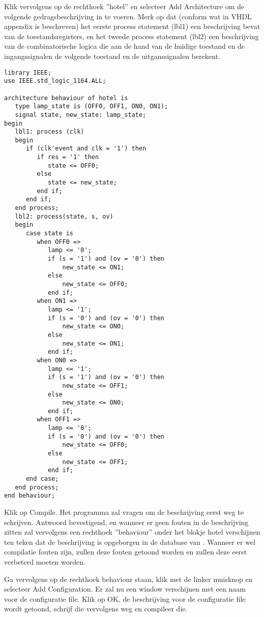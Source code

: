 Klik vervolgens op de rechthoek ''hotel'' en selecteer Add Architecture
om de volgende gedragsbeschrijving in te voeren.
Merk op dat (conform wat in VHDL appendix is beschreven)
het eerste process statement (lbl1) een beschrijving bevat van 
de toestandsregisters, en het tweede process statement
(lbl2) een beschrijving van de combinatorische logica
die aan de hand van de huidige toestand en de ingangssignalen
de volgende toestand en de uitganssignalen berekent.
\begin{verbatim}
library IEEE;
use IEEE.std_logic_1164.ALL;

architecture behaviour of hotel is
   type lamp_state is (OFF0, OFF1, ON0, ON1);
   signal state, new_state: lamp_state;
begin
   lbl1: process (clk)
   begin
      if (clk'event and clk = '1') then
         if res = '1' then
            state <= OFF0;
         else
            state <= new_state;
         end if;
      end if;
   end process;
   lbl2: process(state, s, ov)
   begin
      case state is
         when OFF0 =>
            lamp <= '0';
            if (s = '1') and (ov = '0') then
                new_state <= ON1;
            else
                new_state <= OFF0;
            end if;
         when ON1 =>
            lamp <= '1';
            if (s = '0') and (ov = '0') then
                new_state <= ON0;
            else
                new_state <= ON1;
            end if;
         when ON0 =>
            lamp <= '1';
            if (s = '1') and (ov = '0') then
                new_state <= OFF1;
            else
                new_state <= ON0;
            end if;
         when OFF1 =>
            lamp <= '0';
            if (s = '0') and (ov = '0') then
                new_state <= OFF0;
            else
                new_state <= OFF1;
            end if;
      end case;
   end process;
end behaviour;
\end{verbatim}
Klik op Compile. Het programma zal vragen om de beschrijving eerst
weg te schrijven. Antwoord bevestigend, en wanneer er geen fouten
in de beschrijving zitten zal vervolgens een rechthoek ''behaviour'' 
onder het blokje hotel verschijnen ten teken dat
de beschrijving is opgeborgen in de database van .
Wanneer er wel compilatie fouten zijn, zullen deze fouten getoond
worden en zullen deze eerst verbeterd moeten worden.

Ga vervolgens op de rechthoek behaviour staan, klik met de linker muisknop
en selecteer Add Configuration.
Er zal nu een window verschijnen met een naam voor de  configuratie
file.  
Klik op OK, de  beschrijving voor de configuratie file wordt getoond,
schrijf die vervolgens weg en compileer die.

